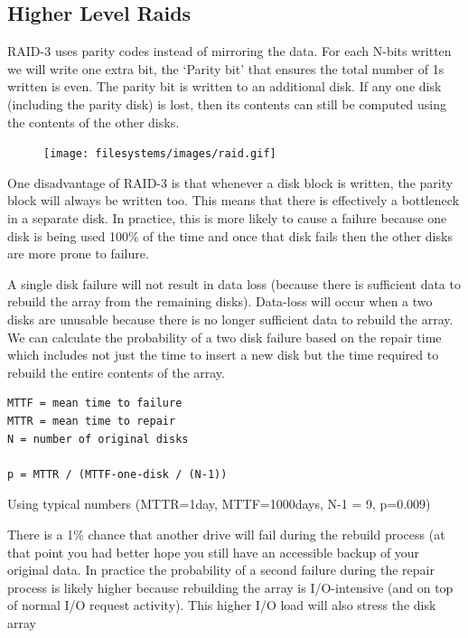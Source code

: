 \subsection{Higher Level Raids}

RAID-3 uses parity codes instead of mirroring the data. For each N-bits written we will write one extra bit, the `Parity bit' that ensures the total number of 1s written is even. The parity bit is written to an additional disk. If any one disk (including the parity disk) is lost, then its contents can still be computed using the contents of the other disks.

\begin{figure}[htbp]
\centering
\texttt{[image: filesystems/images/raid.gif]}
\caption{}
\end{figure}

One disadvantage of RAID-3 is that whenever a disk block is written, the parity block will always be written too. This means that there is effectively a bottleneck in a separate disk. In practice, this is more likely to cause a failure because one disk is being used 100\% of the time and once that disk fails then the other disks are more prone to failure.

A single disk failure will not result in data loss (because there is sufficient data to rebuild the array from the remaining disks). Data-loss will occur when a two disks are unusable because there is no longer sufficient data to rebuild the array. We can calculate the probability of a two disk failure based on the repair time which includes not just the time to insert a new disk but the time required to rebuild the entire contents of the array.

\begin{lstlisting}
MTTF = mean time to failure
MTTR = mean time to repair
N = number of original disks

p = MTTR / (MTTF-one-disk / (N-1))
\end{lstlisting}

Using typical numbers (MTTR=1day, MTTF=1000days, N-1 = 9, p=0.009)

There is a 1\% chance that another drive will fail during the rebuild process (at that point you had better hope you still have an accessible backup of your original data. In practice the probability of a second failure during the repair process is likely higher because rebuilding the array is I/O-intensive (and on top of normal I/O request activity). This higher I/O load will also stress the disk array

